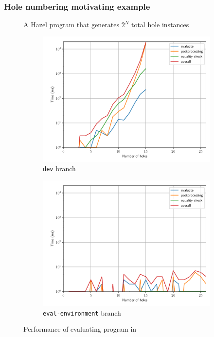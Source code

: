\documentclass{beamer}
\begin{document}
\begin{frame}[allowframebreaks]
  \frametitle{Hole numbering motivating example}

  \begin{figure}
    \centering
    \tiny
    \caption{A Hazel program that generates $2^N$ total hole instances}
    \label{fig:hole-renumbering-problem-2}
  \end{figure}

  \begin{figure}
    \centering
    \begin{subfigure}{0.45\textwidth}
      \centering
      \includegraphics[width=\textwidth]{thesis/img/perf_renum_dev.pdf}
      \caption{\texttt{dev} branch}
      \label{fig:perf-renum-dev}
    \end{subfigure}
    \qquad
    \begin{subfigure}{0.45\textwidth}
      \centering
      \includegraphics[width=\textwidth]{thesis/img/perf_renum_eev.pdf}
      \caption{\texttt{eval-environment} branch}
      \label{fig:perf-renum-eev}
    \end{subfigure}
    \caption{Performance of evaluating program in }
    \label{fig:perf-renum}
  \end{figure}
\end{frame}
\end{document}
